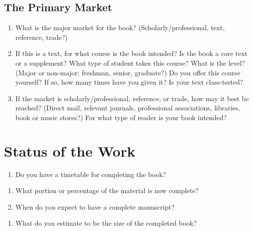 \documentclass[10pt,dvipsnames,enabledeprecatedfontcommands]{scrartcl}
\providecommand{\tightlist}{%
  \setlength{\itemsep}{0pt}\setlength{\parskip}{0pt}}
\begin{document}
\hypertarget{the-primary-market}{%
\subsection{The Primary Market}\label{the-primary-market}}

\begin{enumerate}
\def\labelenumi{\arabic{enumi}.}
\item
  What is the major market for the book? (Scholarly/professional, text,
  reference, trade?)
\item
  If this is a text, for what course is the book intended? Is the book a
  core text or a supplement? What type of student takes this course?
  What is the level? (Major or non-major; freshman, senior, graduate?)
  Do you offer this course yourself? If so, how many times have you
  given it? Is your text class-tested?
\item
  If the market is scholarly/professional, reference, or trade, how may
  it best be reached? (Direct mail, relevant journals, professional
  associations, libraries, book or music stores?) For what type of
  reader is your book intended?
\end{enumerate}

\hypertarget{status-of-the-work}{%
\section{Status of the Work}\label{status-of-the-work}}

\begin{enumerate}
\def\labelenumi{\arabic{enumi}.}
\tightlist
\item
  Do you have a timetable for completing the book?
\end{enumerate}

\begin{enumerate}
\def\labelenumi{\alph{enumi}.}
\item
  What portion or percentage of the material is now complete?
\item
  When do you expect to have a complete manuscript?
\end{enumerate}

\begin{enumerate}
\def\labelenumi{\arabic{enumi}.}
\setcounter{enumi}{1}
\tightlist
\item
  What do you estimate to be the size of the completed book?
\end{enumerate}
\end{document}
